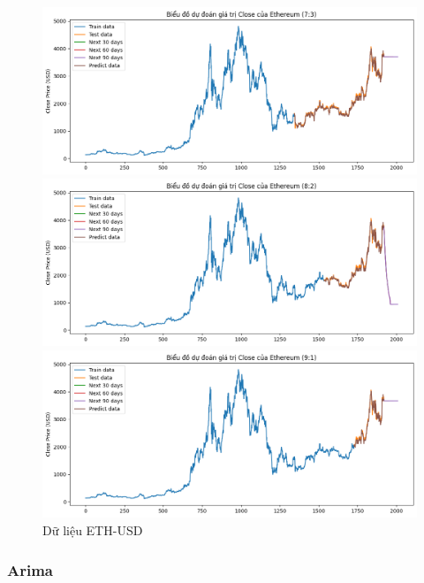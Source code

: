 \documentclass[conference]{IEEEtran}
\begin{document}
	\begin{figure}[H]
		\centering
		\begin{minipage}{0.15\textwidth}
			\centering
			\includegraphics[width=1\textwidth]{Figure/XGB_ETH_73.png}
		\end{minipage}
		\hfill
		\begin{minipage}{0.15\textwidth}
			\centering
			\includegraphics[width=1\textwidth]{Figure/XGB_ETH_82.png}
		\end{minipage}
		\hfill
		\begin{minipage}{0.15\textwidth}
			\centering
			\includegraphics[width=1\textwidth]{Figure/XGB_ETH_91.png}
		\end{minipage}
		\caption{Dữ liệu ETH-USD}
		\label{fig:1}
	\end{figure}
	\subsubsection{Arima} 
\end{document}
